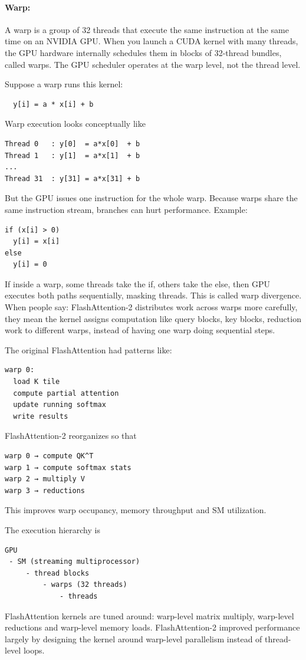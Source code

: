 \documentclass[11pt]{article}  %
\begin{document}
\paragraph{Warp:}
A warp is a group of 32 threads that execute the same instruction at the same time on an NVIDIA GPU. When you launch a CUDA kernel with many threads, the GPU hardware internally schedules them in blocks of 32-thread bundles, called warps. The GPU scheduler operates at the warp level, not the thread level.

Suppose a warp runs this kernel:
\begin{verbatim}
  y[i] = a * x[i] + b
\end{verbatim}
Warp execution looks conceptually like
\begin{verbatim}
Thread 0   : y[0]  = a*x[0]  + b
Thread 1   : y[1]  = a*x[1]  + b
...
Thread 31  : y[31] = a*x[31] + b
\end{verbatim}
But the GPU issues one instruction for the whole warp.
Because warps share the same instruction stream, branches can hurt performance.
Example:
\begin{verbatim}
if (x[i] > 0)
  y[i] = x[i]
else
  y[i] = 0
\end{verbatim}
If inside a warp, some threads take the if, others take the else, then GPU executes both paths sequentially, masking threads.
This is called warp divergence.
When people say: FlashAttention-2 distributes work across warps more carefully, they mean the kernel assigns computation like query blocks, key blocks, reduction work to different warps, instead of having one warp doing sequential steps.

The original FlashAttention had patterns like:
\begin{verbatim}
warp 0:
  load K tile
  compute partial attention
  update running softmax
  write results
\end{verbatim}
FlashAttention-2 reorganizes so that
\begin{verbatim}
warp 0 → compute QK^T
warp 1 → compute softmax stats
warp 2 → multiply V
warp 3 → reductions
\end{verbatim}
This improves warp occupancy, memory throughput and SM utilization.

The execution hierarchy is
\begin{verbatim}
GPU
 - SM (streaming multiprocessor)
     - thread blocks
         - warps (32 threads)
             - threads
\end{verbatim}
FlashAttention kernels are tuned around: warp-level matrix multiply, warp-level reductions and warp-level memory loads.
FlashAttention-2 improved performance largely by designing the kernel around warp-level parallelism instead of thread-level loops.
\end{document}
